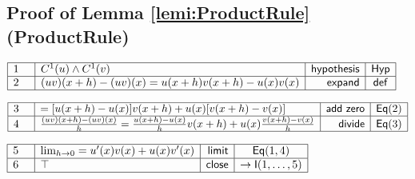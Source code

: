 \documentclass[11pt,reqno]{amsart}
\begin{document}
	\subsection*{Proof of Lemma \protect\ref{lemi:ProductRule} (\textsf{ProductRule})}
	\noindent$\begin{array}{|m{0.5cm}|l|r|c|}
	\hline
	1 & C^{1}(u)\wedge C^{1}(v) & \mathsf{hypothesis} & \mathsf{Hyp} \\ \hline
	2 & (uv)(x+h)-(uv)(x)=u(x+h)v(x+h)-u(x)v(x) & \mathsf{expand} & \mathsf{def} \\ \hline
	\end{array}$
	\par\nointerlineskip\noindent$\begin{array}{|m{0.5cm}|l|r|c|}
	\hline
	3 & =[u(x+h)-u(x)]v(x+h)+u(x)[v(x+h)-v(x)] & \mathsf{add\ zero} & \mathsf{Eq}(2) \\ \hline
	4 & \frac{(uv)(x+h)-(uv)(x)}{h}=\frac{u(x+h)-u(x)}{h}v(x+h)+u(x)\frac{v(x+h)-v(x)}{h} & \mathsf{divide} & \mathsf{Eq}(3) \\ \hline
	\end{array}$
	\par\nointerlineskip\noindent$\begin{array}{|m{0.5cm}|l|r|c|}
	\hline
	5 & \lim_{h\to0}=u^{\prime}(x)v(x)+u(x)v^{\prime}(x) & \mathsf{limit} & \mathsf{Eq}(1,4) \\ \hline
	6 & \top & \mathsf{close} & \to\mathsf{I}(1,\dots,5) \\ \hline
	\end{array}$
	\medskip
	
\end{document}
